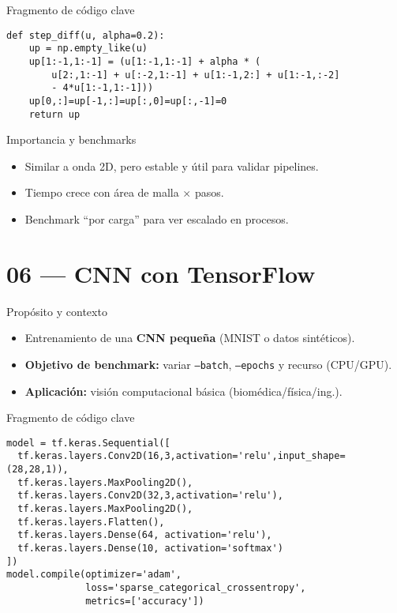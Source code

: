 \documentclass[aspectratio=169,professionalfonts]{beamer}
\begin{document}
\begin{frame}[fragile]{Fragmento de código clave}
\begin{verbatim}
def step_diff(u, alpha=0.2):
    up = np.empty_like(u)
    up[1:-1,1:-1] = (u[1:-1,1:-1] + alpha * (
        u[2:,1:-1] + u[:-2,1:-1] + u[1:-1,2:] + u[1:-1,:-2]
        - 4*u[1:-1,1:-1]))
    up[0,:]=up[-1,:]=up[:,0]=up[:,-1]=0
    return up
\end{verbatim}
\end{frame}

\begin{frame}{Importancia y benchmarks}
\begin{itemize}
  \item Similar a onda 2D, pero estable y útil para validar pipelines.
  \item Tiempo crece con área de malla \(\times\) pasos.
  \item Benchmark “por carga” para ver escalado en procesos.
\end{itemize}
\end{frame}

\section{06 — CNN con TensorFlow}

\begin{frame}{Propósito y contexto}
\begin{itemize}
  \item Entrenamiento de una \textbf{CNN pequeña} (MNIST o datos sintéticos).
  \item \textbf{Objetivo de benchmark:} variar \texttt{--batch}, \texttt{--epochs} y recurso (CPU/GPU).
  \item \textbf{Aplicación:} visión computacional básica (biomédica/física/ing.).
\end{itemize}
\end{frame}

\begin{frame}[fragile]{Fragmento de código clave}
\begin{verbatim}
model = tf.keras.Sequential([
  tf.keras.layers.Conv2D(16,3,activation='relu',input_shape=(28,28,1)),
  tf.keras.layers.MaxPooling2D(),
  tf.keras.layers.Conv2D(32,3,activation='relu'),
  tf.keras.layers.MaxPooling2D(),
  tf.keras.layers.Flatten(),
  tf.keras.layers.Dense(64, activation='relu'),
  tf.keras.layers.Dense(10, activation='softmax')
])
model.compile(optimizer='adam',
              loss='sparse_categorical_crossentropy',
              metrics=['accuracy'])
\end{verbatim}
\end{frame}
\end{document}
